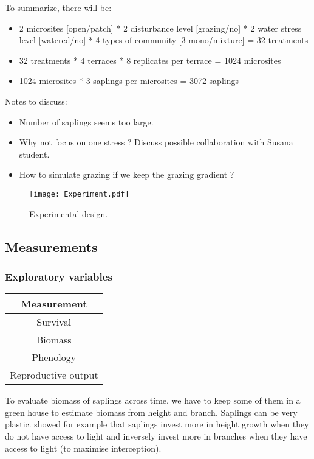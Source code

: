 \documentclass[12pt]{article} %
\begin{document}
To summarize, there will be:
\begin{itemize} %
\item 2 microsites [open/patch] * 2 disturbance level [grazing/no] * 2 water stress level [watered/no] * 4 types of community [3 mono/mixture] = 32 treatments
\item 32 treatments * 4 terraces * 8 replicates per terrace = 1024 microsites
\item 1024 microsites * 3 saplings per microsites = 3072 saplings 
\end{itemize}

Notes to discuss:
\begin{itemize}
	\item Number of saplings seems too large.
	\item Why not focus on one stress ? Discuss possible collaboration with Susana student.
	\item How to simulate grazing if we keep the grazing gradient ?
\end{itemize}

\begin{figure} %
\begin{center}
\texttt{[image: Experiment.pdf]}
\end{center}
\caption{Experimental design.\label{exp}}
\end{figure}

\subsection{Measurements}
\subsubsection{Exploratory variables}
\begin{table}[h]
\begin{center}
\begin{tabular}{c}
Measurement \\ 
\hline
Survival \\ 
Biomass \\ 
Phenology \\ 
Reproductive output \\
\hline 
\end{tabular}
\end{center}
\end{table} 
To evaluate biomass of saplings across time, we have to keep some of them in a green house to estimate biomass from height and branch. Saplings can be very plastic. \citep{Bonser1994} showed for example that saplings invest more in height growth when they do not have access to light and inversely invest more in branches when they have access to light (to maximise interception). 
\end{document}
